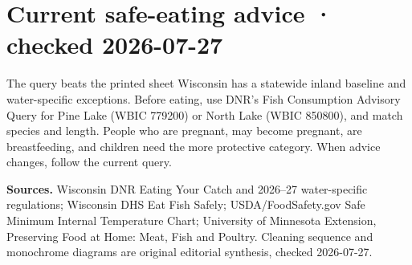 

\section{Current safe-eating advice · checked 2026-07-27}
\Advisory

\begin{center}
\end{center}

\begin{teloshazard}{The query beats the printed sheet}
Wisconsin has a statewide inland baseline and water-specific exceptions.
Before eating, use DNR's Fish Consumption Advisory Query for Pine Lake
(WBIC 779200) or North Lake (WBIC 850800), and match species and length. People
who are pregnant, may become pregnant, are breastfeeding, and children need
the more protective category. When advice changes, follow the current query.
\end{teloshazard}

{\footnotesize\textbf{Sources.} Wisconsin DNR Eating Your Catch and 2026--27
water-specific regulations; Wisconsin DHS Eat Fish Safely; USDA/FoodSafety.gov
Safe Minimum Internal Temperature Chart; University of Minnesota Extension,
Preserving Food at Home: Meat, Fish and Poultry. Cleaning sequence and
monochrome diagrams are original editorial synthesis, checked 2026-07-27.}

